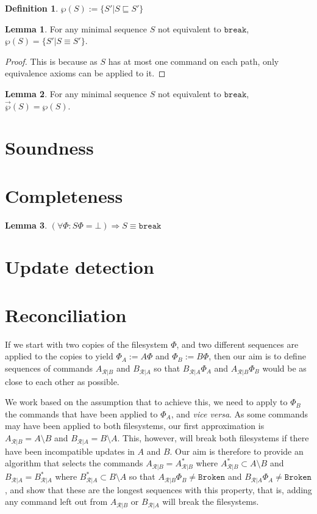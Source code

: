 \documentclass[12pt]{article}
\newcommand{\empt}{\bot}
\newcommand{\fsbroken}{\mathtt{Broken}} %
\newcommand{\FS}{\Phi} %
\newcommand{\cbrk}{\mathtt{break}}
\newcommand{\eqext}{\sqsubseteq}
\newcommand{\extset}[1]{\wp({#1})}
\newcommand{\orderset}[1]{\vec{\wp}({#1})}
\newcommand{\ordered}[1]{#1}
\newcommand{\recchar}[3]{{#1}^{#3}_{\mathcal{R}|{#2}}}
\newcommand{\reca}{\recchar{A}{B}{}} %
\newcommand{\recb}{\recchar{B}{A}{}}
\newcommand{\recaset}{\recchar{A}{B}{*}}
\newcommand{\recbset}{\recchar{B}{A}{*}}
\theoremstyle{definition}
\newtheorem{mydef}{Definition}
\newtheorem{mylem}{Lemma}
\begin{document}
\begin{mydef}
$\extset{S} := \{S'|S\eqext S'\}$
\end{mydef}

\begin{mylem}\label{lemma:minextset}
For any minimal sequence $S$ not equivalent to $\cbrk$, $\extset{S} = \{S'|S\equiv S'\}$.
\end{mylem}
\begin{proof}
This is because as $S$ has at most one command on each path, only equivalence axioms
can be applied to it.
\end{proof}

\begin{mylem}\label{lemma:minextorder}
For any minimal sequence $S$ not equivalent to $\cbrk$,
$\orderset{S} = \extset{S}$.
\end{mylem}


\section{Soundness}

\section{Completeness}

\begin{mylem}
\((\forall\FS: S\FS = \empt) \Rightarrow S \equiv \cbrk\)
\end{mylem}

\section{Update detection}

\section{Reconciliation}

If we start with two copies of the filesystem $\FS$,
and two different sequences are applied to the copies to yield $\FS_A:=A\FS$
and $\FS_B:=B\FS$, then our aim is to define sequences of commands $\reca$ and $\recb$
so that $\recb\FS_A$ and $\reca\FS_B$ would be as close to each other as possible.

We work based on the assumption that to achieve this, we need
to apply to $\FS_B$ the commands that have been applied to $\FS_A$, and \emph{vice versa}.
As some commands may have been applied to both filesystems, our first approximation
is $\reca = \ordered{A\setminus B}$ and $\recb = \ordered{B\setminus A}$.
This, however, will break both filesystems if there have been incompatible updates
in $A$ and $B$. 
Our aim is therefore to provide an algorithm that selects the commands 
$\reca = \ordered{\recaset}$  where $\recaset \subset A\setminus B$
and $\recb = \ordered{\recbset}$ where $\recbset \subset B\setminus A$ 
so that $\reca\FS_B\neq\fsbroken$ and $\recb\FS_A\neq\fsbroken$,
and show that these are the longest sequences with this property, that is,
adding any command left out from $\reca$ or $\recb$ will break the filesystems.
\end{document}
